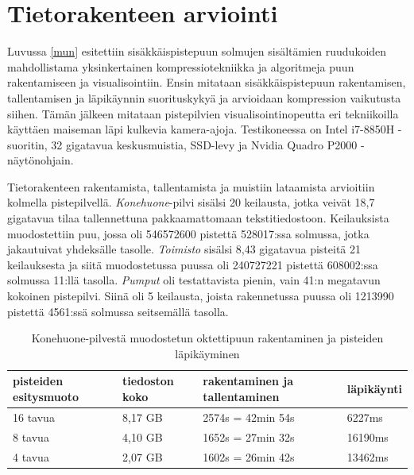 \section{Tietorakenteen arviointi}\label{tulokset}

Luvussa \ref{mun} esitettiin sisäkkäispistepuun solmujen sisältämien ruudukoiden mahdollistama yksinkertainen kompressiotekniikka ja algoritmeja puun rakentamiseen ja visualisointiin. Ensin mitataan sisäkkäispistepuun rakentamisen, tallentamisen ja läpikäynnin suorituskykyä ja arvioidaan kompression vaikutusta siihen. Tämän jälkeen mitataan pistepilvien visualisointinopeutta eri tekniikoilla käyttäen maiseman läpi kulkevia kamera-ajoja. Testikoneessa on Intel i7-8850H -suoritin, 32 gigatavua keskusmuistia, SSD-levy ja Nvidia Quadro P2000 -näytönohjain.  

Tietorakenteen rakentamista, tallentamista ja muistiin lataamista arvioitiin kolmella pistepilvellä. \emph{Konehuone}-pilvi sisälsi 20 keilausta, jotka veivät 18,7 gigatavua tilaa tallennettuna pakkaamattomaan tekstitiedostoon. Keilauksista muodostettiin puu, jossa oli 546572600 pistettä 528017:ssa solmussa, jotka jakautuivat yhdeksälle tasolle. \emph{Toimisto} sisälsi 8,43 gigatavua pisteitä 21 keilauksesta ja siitä muodostetussa puussa oli 240727221 pistettä 608002:ssa solmussa 11:llä tasolla. \emph{Pumput} oli testattavista pienin, vain 41:n megatavun kokoinen pistepilvi. Siinä oli 5 keilausta, joista rakennetussa puussa oli 1213990 pistettä 4561:ssä solmussa seitsemällä tasolla.  

\begin{table}[h]
    \begin{tabular}{|l|l|l|l|}
    \hline
    \textbf{pisteiden esitysmuoto} & \textbf{tiedoston koko} & \textbf{rakentaminen ja tallentaminen} & \textbf{läpikäynti} \\ \hline
    16 tavua       & 8,17 GB             & 2574s = 42min 54s              & 6227ms     \\
    8 tavua        & 4,10 GB             & 1652s = 27min 32s             & 16190ms    \\
    4 tavua        & 2,07 GB             & 1602s = 26min 42s             & 13462ms    \\ \hline
    \end{tabular}
    \caption{Konehuone-pilvestä muodostetun oktettipuun rakentaminen ja pisteiden läpikäyminen}
    \label{taulukko:konehuone}
\end{table}



